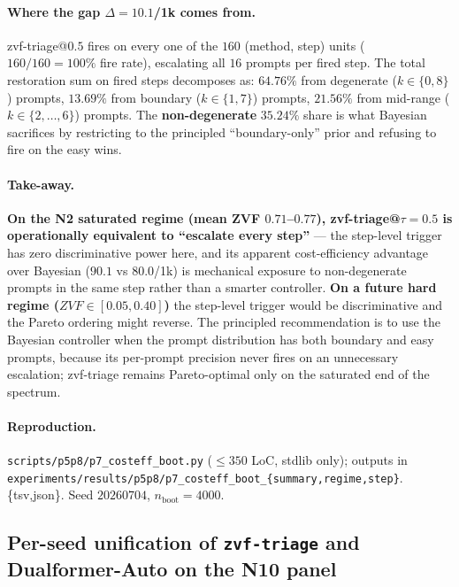 \paragraph{Where the gap $\Delta{=}10.1$/1k comes from.}
zvf-triage@$0.5$ fires on every one of the $160$ (method, step)
units ($160/160 = 100\%$ fire rate), escalating all $16$ prompts
per fired step. The total restoration sum on fired steps decomposes
as: $64.76\%$ from degenerate ($k{\in}\{0,8\}$) prompts,
$13.69\%$ from boundary ($k{\in}\{1,7\}$) prompts, $21.56\%$
from mid-range ($k{\in}\{2,\ldots,6\}$) prompts. The
\textbf{non-degenerate} $35.24\%$ share is what Bayesian
sacrifices by restricting to the principled ``boundary-only''
prior and refusing to fire on the easy wins.

\paragraph{Take-away.}
\textbf{On the N2 saturated regime (mean ZVF $0.71$--$0.77$),
zvf-triage@$\tau{=}0.5$ is operationally equivalent to
``escalate every step''} — the step-level trigger has zero
discriminative power here, and its apparent cost-efficiency
advantage over Bayesian ($90.1$ vs $80.0$/1k) is mechanical
exposure to non-degenerate prompts in the same step rather than
a smarter controller. \textbf{On a future hard regime
($ZVF \in [0.05, 0.40]$)} the step-level trigger would be
discriminative and the Pareto ordering might reverse. The
principled recommendation is to use the Bayesian controller
when the prompt distribution has both boundary and easy prompts,
because its per-prompt precision never fires on an unnecessary
escalation; zvf-triage remains Pareto-optimal only on the
saturated end of the spectrum.

\paragraph{Reproduction.}
\texttt{scripts/p5p8/p7\_costeff\_boot.py} ($\leq 350$ LoC,
stdlib only); outputs in
\texttt{experiments/results/p5p8/p7\_costeff\_boot\_\{summary,regime,step\}}.\{tsv,json\}.
Seed $20260704$, $n_{\mathrm{boot}}{=}4000$.

\subsection{Per-seed unification of \texttt{zvf-triage} and Dualformer-Auto
on the N10 panel}
\label{sec:p7-controller-n10unif}

